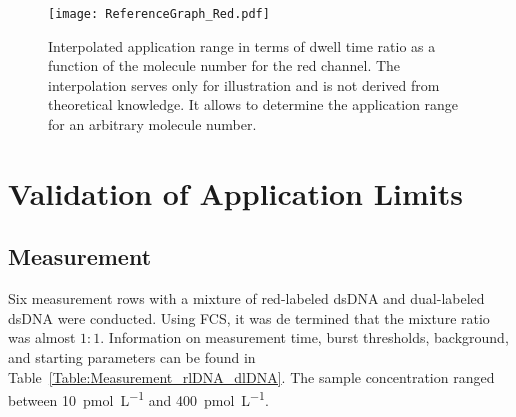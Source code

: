 \vfill
\begin{figure}[h!]
	\centering
	\texttt{[image: ReferenceGraph\_Red.pdf]}
	\caption[Interpolated application range of chance coincidence correction for red channel for measurements with \gls{dsDNA} and ribosomes]{Interpolated application range in terms of dwell time ratio as a function of the molecule number for the red channel. The interpolation serves only for illustration and is not derived from theoretical knowledge. It allows to determine the application range for an arbitrary molecule number.}
	\label{fig:ReferenceGraph_Red}
\end{figure}
\vfill

\clearpage

\section{Validation of Application Limits} \label{Section:ApplicatinLimitsValidation}

\subsection{Measurement} \label{Section:ValdiationMeasurement}

Six measurement rows with a mixture of red-labeled \gls{dsDNA} and dual-labeled \gls{dsDNA} were conducted. Using \gls{FCS}, it was de
termined that the mixture ratio was almost $1:1$. Information on measurement time, burst thresholds, background, and starting parameters can be found in Table~\ref{Table:Measurement_rlDNA_dlDNA}. The sample concentration ranged between \SI{10}{\pico\mole\per\liter} and \SI{400}{\pico\mole\per\liter}.

